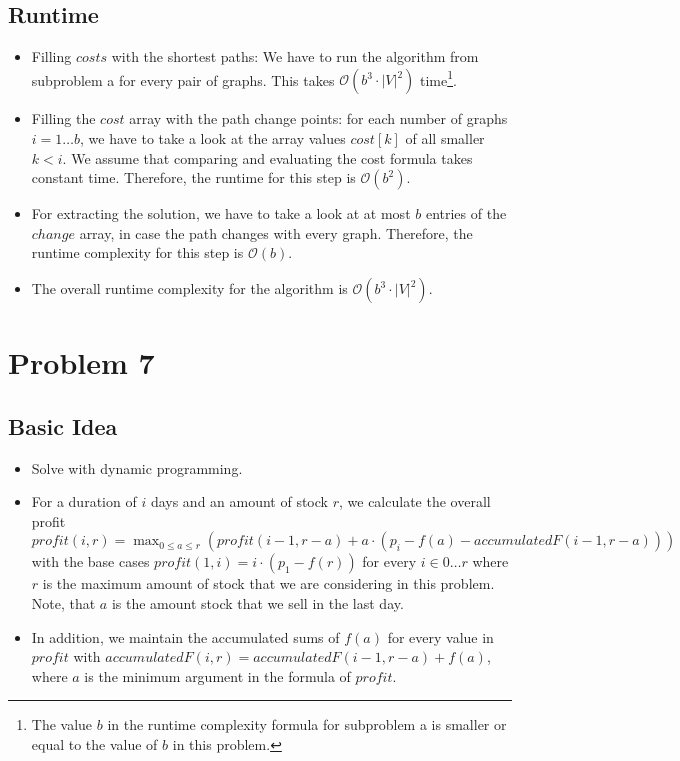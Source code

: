 \documentclass[12pt]{article}
\begin{document}
\subsection*{Runtime}
\begin{itemize}
	\item Filling $\mathit{costs}$ with the shortest paths: We have to run the algorithm from subproblem a for every pair of graphs. This takes $\mathcal{O}(b^3 \cdot |V|^2)$ time\footnote{The value $b$ in the runtime complexity formula for subproblem a is smaller or equal to the value of $b$ in this problem.}.
	\item Filling the $\mathit{cost}$ array with the path change points: for each number of graphs $i=1 \ldots b$, we have to take a look at the array values $\mathit{cost}[k]$ of all smaller $k < i$. We assume that comparing and evaluating the cost formula takes constant time. Therefore, the runtime for this step is $\mathcal{O}(b^2)$.
	\item For extracting the solution, we have to take a look at at most $b$ entries of the $\mathit{change}$ array, in case the path changes with every graph. Therefore, the runtime complexity for this step is $\mathcal{O}(b)$.
	\item The overall runtime complexity for the algorithm is $\mathcal{O}(b^3 \cdot |V|^2)$.
\end{itemize}

\section*{Problem 7}
\subsection*{Basic Idea}
\begin{itemize}
	\item Solve with dynamic programming.
	\item For a duration of $i$ days and an amount of stock $r$, we calculate the overall profit $\mathit{profit}(i, r) = \max_{0 \leq a \leq r} (\mathit{profit}(i-1, r-a) + a \cdot (p_i -f(a) - \mathit{accumulatedF}(i-1, r-a)))$ with the base cases $\mathit{profit}(1,i) = i \cdot (p_1 - f(r))$ for every $i \in 0 \ldots r$  where $r$ is the maximum amount of stock that we are considering in this problem. Note, that $a$ is the amount stock that we sell in the last day.
	\item In addition, we maintain the accumulated sums of $f(a)$ for every value in $\mathit{profit}$ with $\mathit{accumulatedF}(i, r) = \mathit{accumulatedF}(i-1, r-a) + f(a)$, where $a$ is the minimum argument in the formula of $\mathit{profit}$.
\end{itemize}
\end{document}
